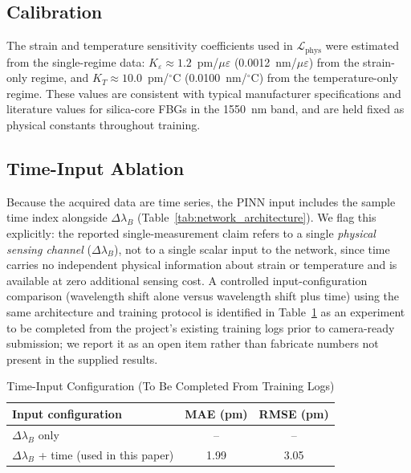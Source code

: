 \documentclass[journal,twoside,web]{ieeecolor}
\begin{document}
\subsection{Calibration}

The strain and temperature sensitivity coefficients used in
$\mathcal{L}_{\text{phys}}$ were estimated from the single-regime data:
$K_\varepsilon \approx 1.2$~pm/$\mu\varepsilon$ (0.0012~nm/$\mu\varepsilon$)
from the strain-only regime, and $K_T \approx 10.0$~pm/$^\circ$C
(0.0100~nm/$^\circ$C) from the temperature-only regime. These values are
consistent with typical manufacturer specifications and literature values
for silica-core FBGs in the 1550~nm band, and are held fixed as physical
constants throughout training.

\subsection{Time-Input Ablation}
\label{subsec:time_ablation}

Because the acquired data are time series, the PINN input includes the
sample time index alongside $\Delta\lambda_B$ (Table~\ref{tab:network_architecture}).
We flag this explicitly: the reported single-measurement claim refers to a
single \emph{physical sensing channel} ($\Delta\lambda_B$), not to a single
scalar input to the network, since time carries no independent physical
information about strain or temperature and is available at zero additional
sensing cost. A controlled input-configuration comparison (wavelength shift
alone versus wavelength shift plus time) using the same architecture and
training protocol is identified in Table~\ref{tab:time_ablation} as an
experiment to be completed from the project's existing training logs prior
to camera-ready submission; we report it as an open item rather than
fabricate numbers not present in the supplied results.

\begin{table}[!t]
\caption{Time-Input Configuration (To Be Completed From Training Logs)}
\label{tab:time_ablation}
\centering
\renewcommand{\arraystretch}{1.2}
\begin{tabular}{|l|c|c|}
\hline
\textbf{Input configuration} & \textbf{MAE (pm)} & \textbf{RMSE (pm)} \\
\hline
$\Delta\lambda_B$ only & -- & -- \\
$\Delta\lambda_B$ + time (used in this paper) & 1.99 & 3.05 \\
\hline
\end{tabular}
\end{table}
\end{document}
